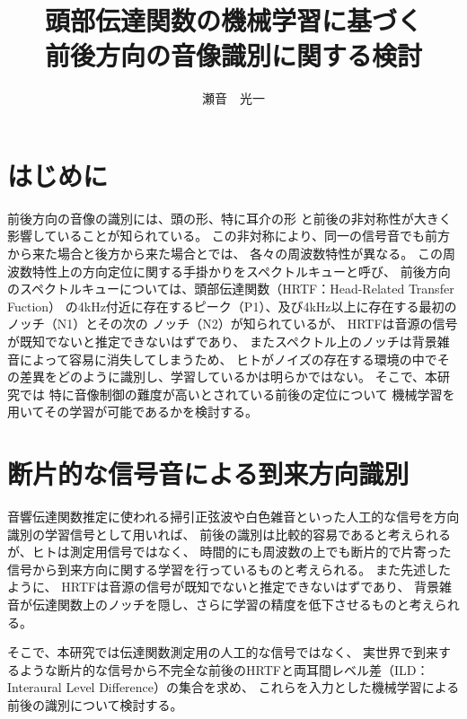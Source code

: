 \documentclass[autodetect-engine,dvi=dvipdfmx,ja=standard,twocolumn,jbase=13.35Q]{bxjsarticle}
\title{頭部伝達関数の機械学習に基づく\\
前後方向の音像識別に関する検討}%
\author{瀬音　光一} %
\begin{document}
\maketitle

\section{はじめに}
前後方向の音像の識別には、頭の形、特に耳介の形
と前後の非対称性が大きく影響していることが知られている。
この非対称により、同一の信号音でも前方から来た場合と後方から来た場合とでは、
各々の周波数特性が異なる。
この周波数特性上の方向定位に関する手掛かりをスペクトルキューと呼び、
前後方向のスペクトルキューについては、頭部伝達関数（HRTF：Head-Related Transfer Fuction）
の4kHz付近に存在するピーク（P1）、及び4kHz以上に存在する最初のノッチ（N1）とその次の
ノッチ（N2）が知られているが\cite{K}、
HRTFは音源の信号が既知でないと推定できないはずであり、
またスペクトル上のノッチは背景雑音によって容易に消失してしまうため、
ヒトがノイズの存在する環境の中でその差異をどのように識別し、学習しているかは明らかではない。
そこで、本研究では
特に音像制御の難度が高いとされている前後の定位\cite{K2}について
機械学習を用いてその学習が可能であるかを検討する。

\section{断片的な信号音による到来方向識別}

音響伝達関数推定に使われる掃引正弦波や白色雑音といった人工的な信号を方向識別の学習信号として用いれば、
前後の識別は比較的容易であると考えられるが、ヒトは測定用信号ではなく、
時間的にも周波数の上でも断片的で片寄った信号から到来方向に関する学習を行っているものと考えられる。
また先述したように、
HRTFは音源の信号が既知でないと推定できないはずであり、
背景雑音が伝達関数上のノッチを隠し、さらに学習の精度を低下させるものと考えられる。

そこで、本研究では伝達関数測定用の人工的な信号ではなく、
実世界で到来するような断片的な信号から不完全な前後のHRTFと両耳間レベル差（ILD：Interaural Level Difference）の集合を求め、
これらを入力とした機械学習による前後の識別について検討する。
     
\end{document}
